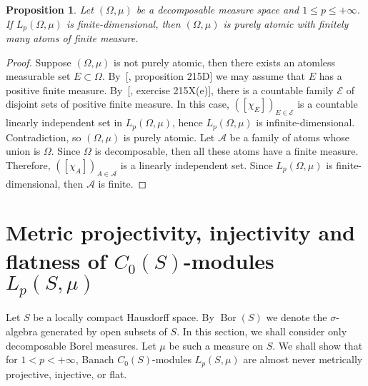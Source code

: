 \documentclass[12pt]{article}
\newtheorem{proposition}[theorem]{Proposition}
\begin{document}
\begin{proposition}\label{LpFinDimCharac}
    Let $(\Omega,\mu)$ be a decomposable measure space 
    and $1\leq p\leq+\infty$. If $L_p(\Omega,\mu)$ is finite-dimensional, 
    then $(\Omega,\mu)$ is purely atomic with finitely many atoms of finite 
    measure.
\end{proposition} 
\begin{proof}
    Suppose $(\Omega,\mu)$ is not purely atomic, then there exists an atomless 
    measurable set $E\subset \Omega$. By~[\cite{FremMeasTh2}, proposition 215D] 
    we may assume that $E$ has a positive finite measure. 
    By~[\cite{FremMeasTh2}, exercise 215X(e)], there is a countable 
    family $\mathcal{E}$ of disjoint sets of positive finite measure. In this 
    case, $([\chi_{E}])_{E\in\mathcal{E}}$ is a countable linearly independent 
    set in $L_p(\Omega,\mu)$, hence $L_p(\Omega,\mu)$ is infinite-dimensional. 
    Contradiction, so $(\Omega,\mu)$ is purely atomic. Let $\mathcal{A}$ be a 
    family of atoms whose union is $\Omega$. Since $\Omega$ is decomposable, 
    then all these atoms have a finite measure. 
    Therefore, $([\chi_{A}])_{A\in\mathcal{A}}$ is a linearly independent set. 
    Since $L_p(\Omega,\mu)$ is finite-dimensional, then $\mathcal{A}$ is finite.
\end{proof}


\section{Metric projectivity, injectivity and flatness of 
\texorpdfstring{$C_0(S)$}{C0(S)}-modules 
\texorpdfstring{$L_p(S,\mu)$}{LpSmu}}
\label{MetrProInjFltOfC0SModLp}

Let $S$ be a locally compact Hausdorff space. By $\operatorname{Bor}(S)$ we 
denote the $\sigma$-algebra generated by open subsets of $S$. In this section, 
we shall consider only decomposable Borel measures. Let $\mu$ be such a measure 
on $S$. We shall show that for $1<p<+\infty$, Banach $C_0(S)$-modules 
$L_p(S,\mu)$ are almost never metrically projective, injective, or flat. 
\end{document}
